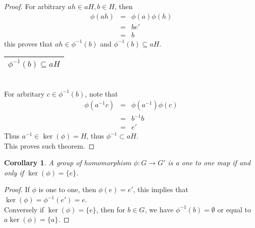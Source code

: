 \documentclass{article}
\theoremstyle{MyNonumberplain}
\theoremstyle{break}
\newtheorem*{proof}{Proof. }
\newcommand{\p}{\phi}
\theoremstyle{break}
\newtheorem{corollary}{Corollary}[theorem]
\theoremstyle{break}
\theoremstyle{definition}
\theoremstyle{break}
\begin{document}
\begin{thmbox}
\begin{prfbox}
\begin{proof}
                    For arbitrary $a h \in a H, b \in H$, then
                    \begin{eqnarray*}
                    \p (a h) & = & \p (a) \p (h)\\
                    & = & b e'\\
                    & = & b
                    \end{eqnarray*}
                    this proves that $a h \in \p^{- 1} (b)$ and $\p^{- 1} (b) \subseteq a H$.\\

                    \begin{tabular}{|c|}
                    \hline
                    $\p^{- 1} (b) \subseteq a H$\\
                    \hline
                    \end{tabular}\\

                    For arbritary $c \in \p^{- 1} (b)$, note that
                    \begin{eqnarray*}
                    \p (a^{- 1} c) & = & \p (a^{- 1}) \p (c)\\
                    & = & b^{- 1} b\\
                    & = & e'
                    \end{eqnarray*}
                    Thus $a^{- 1} \in \ker \left( \p \right) = H$, thus $\p^{- 1} \subset a H$.\\

                    This proves such theorem.
                \end{proof}
            \end{prfbox}
\end{thmbox}

\begin{thmbox}
    \begin{corollary}
        A group of homomorphism $\p : G \rightarrow G'$ is a one to one map if and only if $\ker
        \left( \p \right) = \{ e \}$.
    \end{corollary}
    \begin{prfbox}
        \begin{proof}
            If $\p$ is one to one, then $\p (e) = e'$, this implies that $ \ker \left( \p
            \right) = \p^{- 1} (e') = e$.\\

            Conversely if $\ker \left( \p \right) = \{ e \}$, then for $b \in G$, we have
            $\p^{- 1} (b) = \emptyset$ or equal to $a \ker \left( \p \right) = \{ a \}$.
        \end{proof}
    \end{prfbox}
\end{thmbox}
\end{document}
